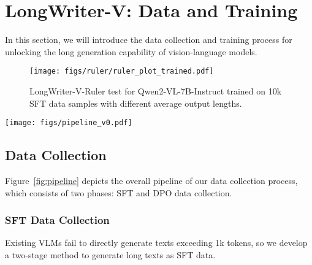 
\section{LongWriter-V: Data and Training}
In this section, we will introduce the data collection and training process for unlocking the long generation capability of vision-language models.


\begin{figure}[t]
    \centering
    \texttt{[image: figs/ruler/ruler\_plot\_trained.pdf]}
    \caption{LongWriter-V-Ruler test for Qwen2-VL-7B-Instruct trained on 10k SFT data samples with different average output lengths. }
    \label{fig:ruler_res_sft}
\end{figure}


\begin{figure*}[t]
    \centering
    \texttt{[image: figs/pipeline\_v0.pdf]}
    \caption{SFT and DPO data collection pipeline of LongWriter-V. The SFT data includes both single-image and multi-image input for long text output. The DPO data contains human revision over each paragraph of VLM's long output. We conduct iterative direct preference optimization to learn the fine-grained human feedback.}
    \label{fig:pipeline}
\end{figure*}

\subsection{Data Collection}
\label{sec:data_collection}
Figure~\ref{fig:pipeline} depicts the overall pipeline of our data collection process, which consists of two phases: SFT and DPO data collection. %


\subsubsection{SFT Data Collection}
\label{sec:sft_data_collection}
Existing VLMs fail to directly generate texts exceeding 1k tokens, so we develop a two-stage method to generate long texts as SFT data.


